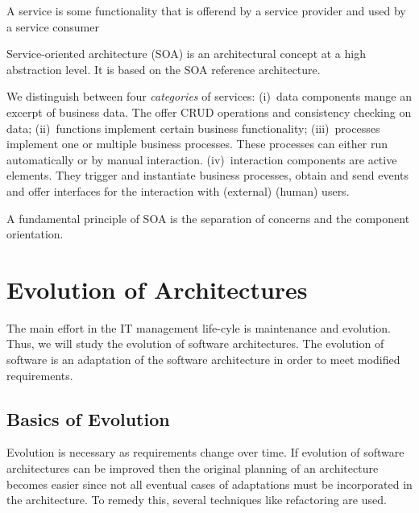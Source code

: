 \begin{definition}[Service]
A service is some functionality that is offerend
by a service provider and used by a service consumer
\end{definition}

\begin{definition}
Service-oriented architecture (SOA) is an architectural concept at a high abstraction level.
It is based on the SOA reference architecture. 
\end{definition}

We distinguish between four \emph{categories} of services:
(i)~data components mange an excerpt of business data. The offer CRUD operations
and consistency checking on data;
(ii)~functions implement certain business functionality;
(iii)~processes implement one or multiple business processes.
These processes can either run automatically or by manual interaction.
(iv)~interaction components are active elements. They trigger and instantiate
business processes, obtain and send events and offer interfaces for the interaction
with (external) (human) users.

A fundamental principle of SOA is the separation of concerns and the component orientation.



\section{Evolution of Architectures}


The main effort in the IT management life-cyle is maintenance and evolution.
Thus, we will study the evolution of software architectures. The evolution 
of software is an adaptation of the software architecture in order to meet
modified requirements.

\subsection{Basics of Evolution}

Evolution is necessary as requirements change over time. If evolution of
software architectures can be improved then the original
planning of an architecture becomes easier since not
all eventual cases of adaptations must be incorporated in the architecture.
To remedy this, several techniques like refactoring are used.

